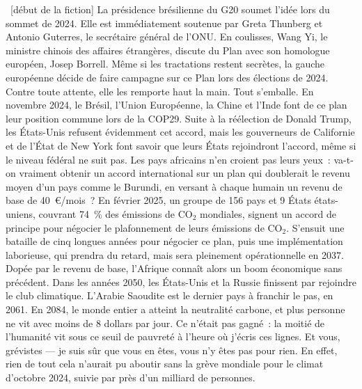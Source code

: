 \documentclass[a5paper,french,openany]{memoir}
\begin{document}
~[début de la fiction] La présidence brésilienne du G20 soumet l'idée lors du sommet de 2024. Elle est immédiatement soutenue par Greta Thunberg et Antonio Guterres, le secrétaire général de l'ONU. 
En coulisses, Wang Yi, le ministre chinois des affaires étrangères, discute du Plan avec son homologue européen, Josep Borrell. 
Même si les tractations restent secrètes, la gauche européenne décide de faire campagne sur ce Plan lors des élections de 2024. Contre toute attente, elle les remporte haut la main. Tout s'emballe. En novembre 2024, le Brésil, l'Union Européenne, la Chine et l'Inde font de ce plan leur position commune lors de la COP29. Suite à la réélection de Donald Trump, les États-Unis refusent évidemment cet accord, mais les gouverneurs de Californie et de l'État de New York font savoir que leurs États rejoindront l'accord, même si le niveau fédéral ne suit pas. Les pays africains n'en croient pas leurs yeux~: 
va-t-on vraiment obtenir un accord international %
sur un plan qui doublerait le revenu moyen d'un pays comme le Burundi, en versant à chaque humain un revenu de base de 40~\euro{}/mois~? En février 2025, un groupe de 156 pays et 9 États états-uniens, couvrant 74~\% des émissions de CO$_\text{2}$ mondiales, signent un accord de principe pour négocier le plafonnement de leurs émissions de CO$_\text{2}$. S'ensuit une bataille de cinq longues années pour négocier ce plan, puis une implémentation laborieuse, qui prendra du retard, mais sera pleinement opérationnelle en 2037. Dopée par le revenu de base, l'Afrique connaît alors un boom économique sans précédent. Dans les années 2050, les États-Unis et la Russie finissent par rejoindre le club climatique. L'Arabie Saoudite est le dernier pays à franchir le pas, en 2061. En 2084, le monde entier a atteint la neutralité carbone, et plus personne ne vit avec moins de 8 dollars par jour. Ce n'était pas gagné~: la moitié de l'humanité vit sous ce seuil de pauvreté à l'heure où j'écris ces lignes. %
Et vous, grévistes --- je suis sûr que vous en êtes, vous n'y êtes pas pour rien. En effet, rien de tout cela n'aurait pu aboutir sans la grève mondiale pour le climat d'octobre 2024, suivie par près d'un milliard de personnes.
\end{document}
